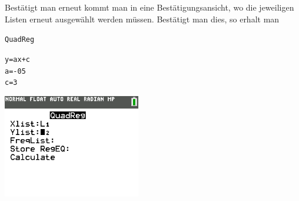 \begin{paracol}{2}
	\begin{flushleft}
	Bestätigt man erneut kommt man in eine Bestätigungsansicht, wo die jeweiligen Listen erneut ausgewählt werden müssen. Bestätigt man dies, so erhalt man 
	\begin{center}
			\texttt{QuadReg}\\
			\end{center}
			\texttt{y=ax+c}\\
			\texttt{a=-05}\\
			\texttt{c=3}
	\end{flushleft}	
\switchcolumn
	\begin{flushright}
		\includegraphics[width=6cm]{Media/GRT/Visualisierung/Regression/Regression_4.png}
		
	\end{flushright}
\end{paracol}
\pagebreak
